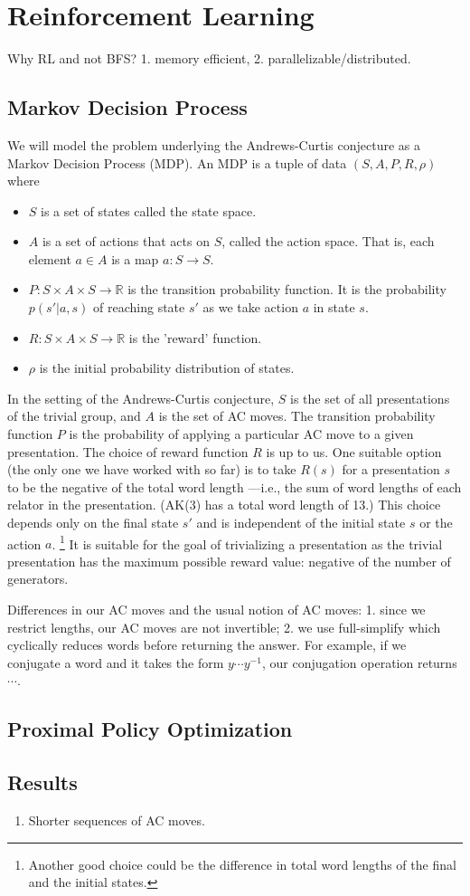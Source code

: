 
\section{Reinforcement Learning}
Why RL and not BFS? 1. memory efficient, 2. parallelizable/distributed.
\subsection{Markov Decision Process}

We will model the problem underlying the Andrews-Curtis conjecture as a Markov Decision Process (MDP).
An MDP is a tuple of data $(S, A, P, R, \rho)$ where
\begin{itemize}
	\item $S$ is a set of states called the state space.
	\item $A$ is a set of actions that acts on $S$, called the action space.
	That is, each element $a \in A$ is a map $a \colon S \to S$.
	\item $P \colon S \times A \times S \to \mathbb{R}$ is the transition
	probability function.
	It is the probability $p (s' | a, s)$ of reaching
	state $s'$ as we take action $a$ in state $s$.
	\item $R \colon S \times A \times S \to \mathbb{R}$ is the 'reward' function.
	\item $\rho$ is the initial probability distribution of states.
\end{itemize}

In the setting of the Andrews-Curtis conjecture, $S$ is the set of all presentations of the trivial group, and $A$ is the set of AC moves.
The transition probability function $P$ is the probability of applying a particular AC move to a given presentation.
The choice of reward function $R$ is up to us.
One suitable option (the only one we have worked with so far) is to take $R(s)$ for a presentation $s$ to be the negative of the total word length ---i.e., the sum of word lengths of each relator in the presentation.
(AK(3) has a total word length of 13.)
This choice depends only on the final state $s'$ and is independent of the initial state $s$
or the action $a$.
\footnote{Another good choice could be the difference in total word lengths of the final and the initial states.} It is suitable for the goal of trivializing a presentation as the trivial presentation has the maximum possible reward value: negative of the number of generators.

Differences in our AC moves and the usual notion of AC moves: 1.
since we restrict lengths, our AC moves are not invertible; 2.
we use full-simplify which cyclically reduces words before returning the answer.
For example, if we conjugate a word and it takes the form $y \cdots y^{-1}$, our conjugation operation returns $\cdots$.


\subsection{Proximal Policy Optimization}


\subsection{Results}

\begin{enumerate}
\item Shorter sequences of AC moves. 
\end{enumerate}
